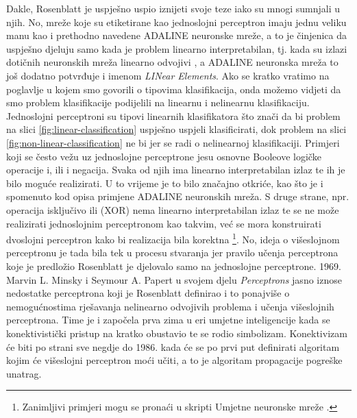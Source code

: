 \documentclass[times, utf8, zavrsni]{fer}
\begin{document}
\bigskip

Dakle, Rosenblatt je uspješno uspio iznijeti svoje teze iako su mnogi sumnjali u njih. No, mreže koje su etiketirane kao jednoslojni perceptron imaju jednu veliku manu kao i prethodno navedene ADALINE neuronske mreže, a to je činjenica da uspješno djeluju samo kada je problem linearno interpretabilan, tj. kada su izlazi dotičnih neuronskih mreža linearno odvojivi , a ADALINE neuronska mreža to još dodatno potvrđuje i imenom \textit{LINear Elements}. Ako se kratko vratimo na poglavlje u kojem smo govorili o tipovima klasifikacija, onda možemo vidjeti da smo problem klasifikacije podijelili na linearnu i nelinearnu klasifikaciju. Jednoslojni perceptroni su tipovi linearnih klasifikatora što znači da bi problem na slici \ref{fig:linear-classification} uspješno uspjeli klasificirati, dok problem na slici \ref{fig:non-linear-classification} ne bi jer se radi o nelinearnoj klasifikaciji. Primjeri koji se često vežu uz jednoslojne perceptrone jesu osnovne Booleove logičke operacije i, ili i negacija. Svaka od njih ima linearno interpretabilan izlaz te ih je bilo moguće realizirati. U to vrijeme je to bilo značajno otkriće, kao što je i spomenuto kod opisa primjene ADALINE neuronskih mreža. S druge strane, npr. operacija isključivo ili (XOR) nema linearno interpretabilan izlaz te se ne može realizirati jednoslojnim perceptronom kao takvim, već se mora konstruirati dvoslojni perceptron kako bi realizacija bila korektna \footnote{Zanimljivi primjeri mogu se pronaći u skripti Umjetne neuronske mreže \citep{cupicANN}.}. No, ideja o višeslojnom perceptronu je tada bila tek u procesu stvaranja jer pravilo učenja perceptrona koje je predložio Rosenblatt je djelovalo samo na jednoslojne perceptrone. 1969. Marvin L. Minsky i Seymour A. Papert u svojem djelu \textit{Perceptrons} jasno iznose nedostatke perceptrona koji je Rosenblatt definirao i to ponajviše o nemogućnostima rješavanja nelinearno odvojivih problema i učenja višeslojnih perceptrona. Time je i započela prva zima u eri umjetne inteligencije  kada se konektivistički pristup na kratko obustavio te se rodio simbolizam. Konektivizam će biti po strani sve negdje do 1986. kada će se po prvi put definirati algoritam kojim će višeslojni perceptron moći učiti, a to je algoritam propagacije pogreške unatrag.
\end{document}
